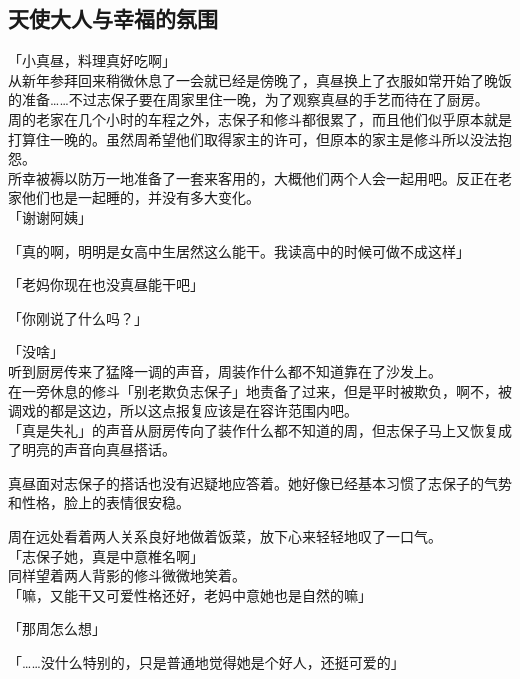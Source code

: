 ﻿\subsection{天使大人与幸福的氛围}

「小真昼，料理真好吃啊」\\

从新年参拜回来稍微休息了一会就已经是傍晚了，真昼换上了衣服如常开始了晚饭的准备……不过志保子要在周家里住一晚，为了观察真昼的手艺而待在了厨房。\\

周的老家在几个小时的车程之外，志保子和修斗都很累了，而且他们似乎原本就是打算住一晚的。虽然周希望他们取得家主的许可，但原本的家主是修斗所以没法抱怨。\\

所幸被褥以防万一地准备了一套来客用的，大概他们两个人会一起用吧。反正在老家他们也是一起睡的，并没有多大变化。\\

「谢谢阿姨」

「真的啊，明明是女高中生居然这么能干。我读高中的时候可做不成这样」

「老妈你现在也没真昼能干吧」

「你刚说了什么吗？」

「没啥」\\

听到厨房传来了猛降一调的声音，周装作什么都不知道靠在了沙发上。\\

在一旁休息的修斗「别老欺负志保子」地责备了过来，但是平时被欺负，啊不，被调戏的都是这边，所以这点报复应该是在容许范围内吧。\\

「真是失礼」的声音从厨房传向了装作什么都不知道的周，但志保子马上又恢复成了明亮的声音向真昼搭话。

真昼面对志保子的搭话也没有迟疑地应答着。她好像已经基本习惯了志保子的气势和性格，脸上的表情很安稳。

周在远处看着两人关系良好地做着饭菜，放下心来轻轻地叹了一口气。\\

「志保子她，真是中意椎名啊」\\

同样望着两人背影的修斗微微地笑着。\\

「嘛，又能干又可爱性格还好，老妈中意她也是自然的嘛」

「那周怎么想」

「……没什么特别的，只是普通地觉得她是个好人，还挺可爱的」

